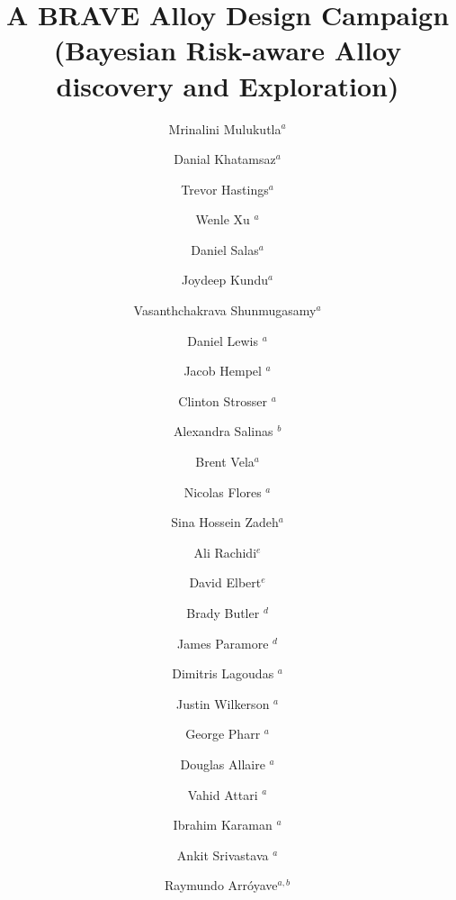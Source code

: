 \documentclass[final,5p,times,twocolumn]{elsarticle}
\begin{document}
\begin{frontmatter}
\title{\Large{A BRAVE Alloy Design Campaign\\
(Bayesian Risk-aware Alloy discovery and Exploration)}}




\author{Mrinalini Mulukutla$^{a}$} 
\author{Danial Khatamsaz$^{a}$}
\author{Trevor Hastings$^{a}$}
\author{Wenle Xu $^{a}$}
\author{Daniel Salas$^{a}$}
\author{Joydeep Kundu$^{a}$}
\author{Vasanthchakrava Shunmugasamy$^{a}$}
\author{Daniel Lewis $^{a}$}
\author{Jacob Hempel $^{a}$}
\author{Clinton Strosser $^{a}$}
\author{Alexandra Salinas $^{b}$}
\author{Brent Vela$^{a}$}
\author{Nicolas Flores $^{a}$}
\author{Sina Hossein Zadeh$^{a}$}
\author{Ali Rachidi$^{e}$}
\author{David Elbert$^{e}$}
\author{Brady Butler $^{d}$}
\author{James Paramore $^{d}$}
\author{Dimitris Lagoudas $^{a}$}
\author{Justin Wilkerson $^{a}$}
\author{George Pharr $^{a}$}
\author{Douglas Allaire $^{a}$}
\author{Vahid Attari $^{a}$}
\author{Ibrahim Karaman $^{a}$}
\author{Ankit Srivastava $^{a}$}
\author{Raymundo Arr\'{o}yave$^{a,b}$}


\address{$^a$Department of Materials Science and Engineering, Texas A\&M University, College Station, TX 77843, USA}
\address{$^b$Mechanical Engineering Department, Texas A\&M University, College Station, TX, USA 77840}
\address{$^d$DEVCOM Army Research Laboratory South at Texas A\&M University, College Station, TX 77843-3003, USA}
\address{$^e$Hopkins Extreme Materials Institute, Johns Hopkins University, Baltimore, Maryland, 21218, USA}



\end{frontmatter}
\end{document}
